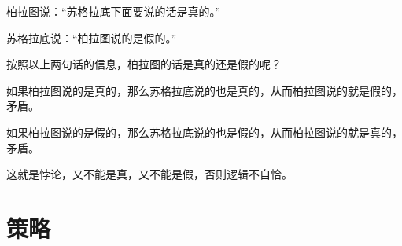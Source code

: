 \begin{example}\mbox{}\par
  柏拉图说：“苏格拉底下面要说的话是真的。”

  苏格拉底说：“柏拉图说的是假的。”
\end{example}

按照以上两句话的信息，柏拉图的话是真的还是假的呢？

如果柏拉图说的是真的，那么苏格拉底说的也是真的，从而柏拉图说的就是假的，矛盾。

如果柏拉图说的是假的，那么苏格拉底说的也是假的，从而柏拉图说的就是真的，矛盾。

这就是悖论，又不能是真，又不能是假，否则逻辑不自恰。


\section{策略}
\label{sec:logic-strategy}

